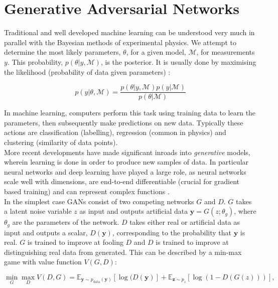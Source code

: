\documentclass{report}
\begin{document}
 
\section{Generative Adversarial Networks}
\label{sec:ml}

Traditional and well developed machine learning can be understood very much in parallel with the Bayesian methods of experimental physics. We attempt to determine the most likely parameters, $\theta$, for a given model, $\mathcal{M}$, for measurements $y$. This probability, $p(\theta|y, \mathcal{M})$, is the posterior. It is usually done by maximising the likelihood (probability of data given parameters) \cite{data}:

\[
p(y|\theta, \mathcal{M}) = \frac{p(\theta|y, \mathcal{M})p(y|\mathcal{M})}{p(\theta|\mathcal{M})}
\]

In machine learning, computers perform this task using training data to learn the parameters, then subsequently make predictions on new data. Typically these actions are classification (labelling), regression (common in physics) and clustering (similarity of data points). \\

More recent developments have made significant inroads into \textit{generative} models, wherein learning is done in order to produce new samples of data. In particular neural networks and deep learning have played a large role, as neural networks scale well with dimensions, are end-to-end differentiable (crucial for gradient based training) and can represent complex functions \cite{deepgen}.\\


In the simplest case GANs consist of two competing networks $G$ and $D$. $G$ takes a latent noise variable $z$ as input and outputs artificial data $\mathbf{y} = G(z;\theta_g)$, where $\theta_g$ are the parameters of the network. $D$ takes either real or artificial data as input and outputs a scalar, $D(\mathbf{y})$, corresponding to the probability that $\mathbf{y}$ is real. $G$ is trained to improve at fooling $D$ and $D$ is trained to improve at distinguishing real data from generated. This can be described by a min-max game with value function $V(G,D)$:

\begin{equation}
	\label{eq:minmax}
	\min_{G}\max_{D}V(D,G) = \mathbb{E}_{\mathbf{y}\sim p_{\text{data}}(\mathbf{y})} [\log(D(\mathbf{y})] + \mathbb{E}_{\mathbf{z}\sim p_{z}} [\log(1-D(G(z)))], 
\end{equation} 
\end{document}
